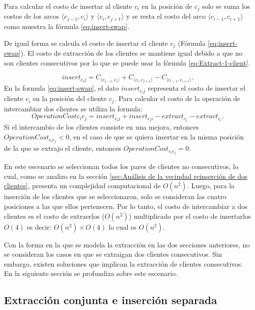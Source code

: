 \documentclass[12pt]{report}
\begin{document}
        Para calcular el costo de insertar al cliente $c_i$ en la posición de $c_j$ solo se suma los costos de los arcos $\langle c_{j-1},c_i \rangle$ y $\langle c_i,c_{j+1} \rangle$ y se resta el costo del arco $\langle c_{i-1},c_{i+1} \rangle$ como muestra la fórmula \ref{eq:insert-swap}.

        De igual forma se calcula el costo de insertar el cliente $c_j$ (Fórmula \ref{eq:insert-swap}). El costo de extracción de los clientes se mantiene igual debido a que no son clientes consecutivos por lo que se puede usar la fórmula \ref{eq:Extract-1-client}.

    \begin{equation}
    	insert_{c_ij} = C_{\langle c_{j-1},c_i \rangle} + C_{\langle c_i,c_{j+1} \rangle} - C_{\langle c_{i-1},c_{i+1} \rangle} \text{.}
    	\label{eq:insert-swap}
    \end{equation}
    En la formula \ref{eq:insert-swap}, el dato $insert_{c_ij}$ representa el costo de insertar el cliente $c_i$ en la posición del cliente $c_j$.
    Para calcular el costo de la operación de intercambiar dos clientes se utiliza la formula:
    \begin{equation}
    	OperationCost{c_ic_j} = insert_{c_ij} + insert_{c_ji} - extract_{c_j} - extract_{c_i}.
    \end{equation}
	Si el intercambio de los clientes consiste en una mejora, entonces $OperationCost_{c_ic_j} < 0$, en el caso de que se quiera insertar en la misma posición de la que se extrajo el cliente, entonces $OperationCost_{c_ic_j} = 0$.

	En este escenario se seleccionan todos los pares de clientes no consecutivos, lo cual, como se analizo en la sección \ref{sec:Análisis de la vecindad reinserción de dos clientes}, presenta un complejidad computacional de $O(n^2)$. Luego, para la inserción de los clientes que se seleccionaron, solo se consideran las cuatro posiciones a las que ellos pertenecen. Por lo tanto, el costo de intercambiar a dos clientes es el costo de extraerlos ($O(n^2)$) multiplicado por el costo de insertarlos $O(4)$ es decir: $O(n^2) \times O(4)$ lo cual es $O(n^2)$.

	Con la forma en la que se modela la extracción en las dos secciones anteriores, no se consideran los casos en que se extraigan dos clientes consecutivos. Sin embargo, existen soluciones que implican la extracción de clientes consecutivos. En la siguiente sección se profundiza sobre este escenario.

	\subsection{Extracción conjunta e inserción separada}
	\label{sec:Extracción conjunta e inserción separada}
\end{document}
